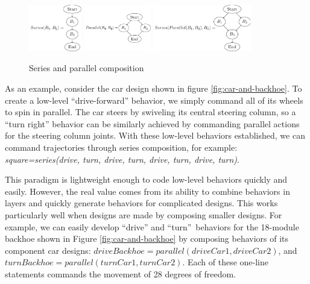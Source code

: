 \documentclass[graybox]{svmult}
\begin{document}
\begin{figure}
\begin{center}
\includegraphics[height=0.8in]{images/tikz/series.pdf}
\includegraphics[height=0.8in]{images/tikz/parallel.pdf} \vspace{0.in}
\includegraphics[height=0.8in]{images/tikz/parallel-and-series.pdf}
\end{center}
\caption{Series and parallel composition }
\label{fig:graph-composition}
\end{figure}

As an example, consider the car design shown in figure \ref{fig:car-and-backhoe}. To create a low-level
``drive-forward'' behavior, we simply command all of its wheels to spin  in parallel.
The car steers by swiveling its central steering column, so a ``turn right''
behavior can be similarly achieved by commanding parallel actions for the steering column joints.
With these low-level behaviors established, we can command trajectories through series
composition, for example: \textit{square=series(drive, turn, drive, turn, drive, turn,
drive, turn)}.

This paradigm  is lightweight enough to code  low-level behaviors quickly and
easily. However, the real value comes from its ability to  combine behaviors
in layers and quickly generate behaviors for complicated designs. This works
particularly well when designs are made by composing smaller designs. For
example, we can easily develop ``drive'' and ``turn''\ behaviors for the
18-module backhoe shown in Figure \ref{fig:car-and-backhoe} by composing  behaviors of
its component car designs: \(driveBackhoe= parallel( driveCar1, driveCar2)\),
and \(turnBackhoe = parallel(turnCar1, turnCar2)\). Each of these one-line
statements commands the movement of  28 degrees of freedom.
\end{document}
